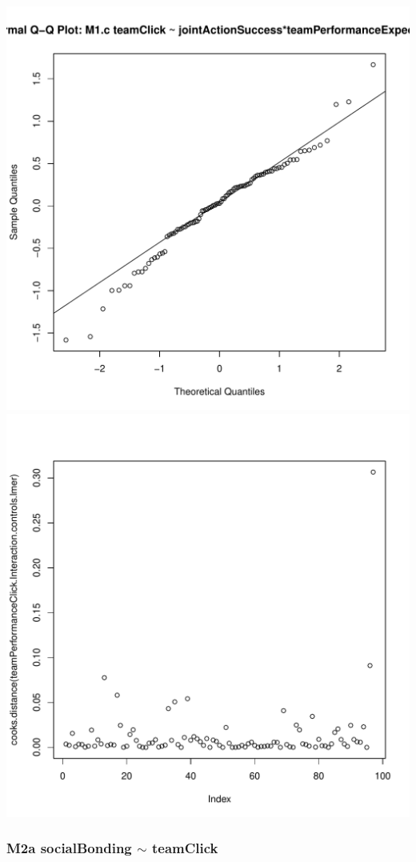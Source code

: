 \documentclass[12pt]{report}
\begin{document}
\includegraphics[scale =.4]{../images/MLM1cQQNorm.pdf}
\includegraphics[scale =.4]{../images/MLM1cCooksD.pdf}

\newpage
\subsubsection{M2a socialBonding $\sim$ teamClick}
\end{document}
